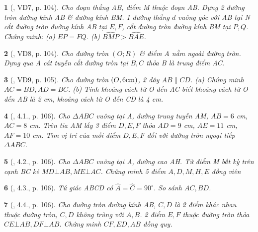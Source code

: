 \documentclass{article}
\newtheorem{baitoan}{}
\begin{document}
\begin{baitoan}[\cite{Binh_boi_duong_Toan_9_tap_1}, VD7, p. 104]
	Cho đoạn thẳng AB, điểm M thuộc đoạn AB. Dựng 2 đường tròn đường kính AB \& đường kính BM. 1 đường thẳng $d$ vuông góc với AB tại N cắt đường tròn đường kính AB tại $E,F$, cắt đường tròn đường kính BM tại $P,Q$. Chứng minh: (a) $EP = FQ$. (b) $\widehat{BMP} > \widehat{BAE}$.
\end{baitoan}

\begin{baitoan}[\cite{Binh_boi_duong_Toan_9_tap_1}, VD8, p. 104]
	Cho đường tròn $(O;R)$ \& điểm A nằm ngoài đường tròn. Dựng qua A cát tuyến cắt đường tròn tại $B,C$ thỏa B là trung điểm AC.
\end{baitoan}

\begin{baitoan}[\cite{Binh_boi_duong_Toan_9_tap_1}, VD9, p. 105]
	Cho đường tròn $(O,6{\rm cm})$, 2 dây $AB\parallel CD$. (a) Chứng minh $AC = BD,AD = BC$. (b) Tính khoảng cách từ O đến AC biết khoảng cách từ O đến AB là {\rm2 cm}, khoảng cách từ O đến CD là {\rm4 cm}.
\end{baitoan}

\begin{baitoan}[\cite{Binh_boi_duong_Toan_9_tap_1}, 4.1., p. 106]
	Cho $\Delta ABC$ vuông tại A, đường trung tuyến AM, $AB = 6$ {\rm cm}, $AC = 8$ {\rm cm}. Trên tia AM lấy 3 điểm $D,E,F$ thỏa $AD = 9$ {\rm cm}, $AE = 11$ {\rm cm}, $AF = 10$ {\rm cm}. Tìm vị trí của mỗi điểm $D,E,F$ đối với đường tròn ngoại tiếp $\Delta ABC$.
\end{baitoan}

\begin{baitoan}[\cite{Binh_boi_duong_Toan_9_tap_1}, 4.2., p. 106]
	Cho $\Delta ABC$ vuông tại A, đường cao AH. Từ điểm M bất kỳ trên cạnh BC kẻ $MD\bot AB,ME\bot AC$. Chứng minh 5 điểm $A,D,M,H,E$ đồng viên
\end{baitoan}

\begin{baitoan}[\cite{Binh_boi_duong_Toan_9_tap_1}, 4.3., p. 106]
	Tứ giác ABCD có $\widehat{A} = \widehat{C} = 90^\circ$. So sánh $AC,BD$.
\end{baitoan}

\begin{baitoan}[\cite{Binh_boi_duong_Toan_9_tap_1}, 4.4., p. 106]
	Cho đường tròn đường kính AB, $C,D$ là 2 điểm khác nhau thuộc đường tròn, $C,D$ không trùng với $A,B$. 2 điểm $E,F$ thuộc đường tròn thỏa $CE\bot AB,DF\bot AB$. Chứng minh $CF,ED,AB$ đồng quy.
\end{baitoan}
\end{document}
